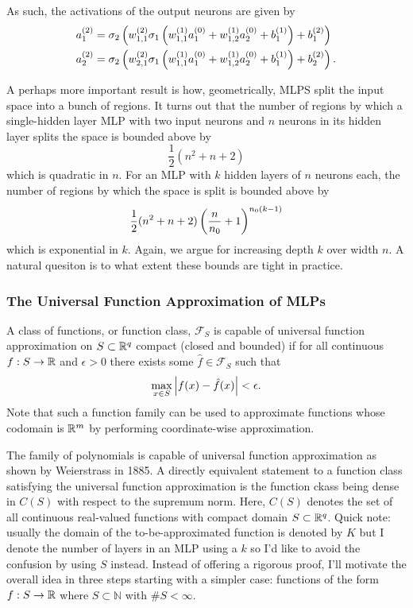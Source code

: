 \documentclass[11pt]{article}
\begin{document}
\noindent As such, the activations of the output neurons are given by
\begin{align*}
    a_1^{(2)}&=\sigma_2\left(w_{1,1}^{(2)}\sigma_1\left(w_{1,1}^{(1)}a_1^{(0)}+w_{1,2}^{(1)}a_2^{(0)}+b_1^{(1)}\right) + b_1^{(2)}\right)\\
    a_2^{(2)}&=\sigma_2\left(w_{2,1}^{(2)}\sigma_1\left(w_{1,1}^{(1)}a_1^{(0)}+w_{1,2}^{(1)}a_2^{(0)}+b_1^{(1)}\right) + b_2^{(2)}\right).
\end{align*}

\begin{tcolorbox}[title={\centering\textbf{Further advocating for depth over width}}, colback=myLightBlue, colbacktitle=myDarkBlue, colframe=myDarkBlue, coltitle=white]
    A perhaps more important result is how, geometrically, MLPS split the input space into a bunch of regions. It turns out that the number of regions by which a single-hidden layer MLP with two input neurons and $n$ neurons in its hidden layer splits the space is bounded above by
    $$
    \frac{1}{2}(n^2+n+2)
    $$
    which is quadratic in $n$. For an MLP with $k$ hidden layers of $n$ neurons each, the number of regions by which the space is split is bounded above by
    $$
    \frac{1}{2}(n^2+n+2)\left(\frac{n}{n_0}+1\right)^{n_0(k-1)}
    $$
    which is exponential in $k$. Again, we argue for increasing depth $k$ over width $n$. A natural quesiton is to what extent these bounds are tight in practice.
\end{tcolorbox}

\subsubsection{The Universal Function Approximation of MLPs}
\label{subsubsec:universal_function_approximation_theorem}
 A class of functions, or function class, $\mathcal{F}_S$ is capable of universal function approximation on $S\subset\mathbb{R}^q$ compact (closed and bounded) if for all continuous $f:S\to\mathbb{R}$ and $\epsilon>0$ there exists some $\hat{f}\in\mathcal{F}_S$ such that
$$
\max_{x\in S}\left|f(x)-\hat{f}(x)\right|<\epsilon.
$$
Note that such a function family can be used to approximate functions whose codomain is $\mathbb{R}^m$ by performing coordinate-wise approximation. 

The family of polynomials is capable of universal function approximation as shown by Weierstrass in 1885. A directly equivalent statement to a function class satisfying the universal function approximation is the function ckass being dense in $C(S)$ with respect to the supremum norm. Here, $C(S)$ denotes the set of all continuous real-valued functions with compact domain $S\subset\mathbb{R}^q$. Quick note: usually the domain of the to-be-approximated function is denoted by $K$ but I denote the number of layers in an MLP using a $k$ so I'd like to avoid the confusion by using $S$ instead. Instead of offering a rigorous proof, I'll motivate the overall idea in three steps starting with a simpler case: functions of the form $f:S\to\mathbb{R}$ where $S\subset\mathbb{N}$ with $\#S<\infty$.
\end{document}
